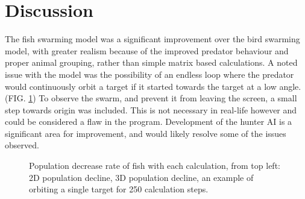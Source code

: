 \documentclass[
reprint,
showpacs,
preprintnumbers,
bibnotes,
amsmath,
amssymb,
aps,
pra,
floatfix,
]{revtex4-1}
\begin{document}
\section{\label{sec:discussion}Discussion}
The fish swarming model was a significant improvement over the bird swarming model, with greater realism because of the improved predator behaviour and proper animal grouping, rather than simple matrix based calculations.
A noted issue with the model was the possibility of an endless loop where the predator would continuously orbit a target if it started towards the target at a low angle. (FIG. \ref{fig:popdecline})
To observe the swarm, and prevent it from leaving the screen, a small step towards origin was included. This is not necessary in real-life however and could be considered a flaw in the program.
Development of the hunter AI is a significant area for improvement, and would likely resolve some of the issues observed.

\begin{figure}[!htp]
		\centering
		

	\caption{Population decrease rate of fish with each calculation, from top left: 2D population decline, 3D population decline, an example of orbiting a single target for 250 calculation steps.}
	\label{fig:popdecline}
\end{figure}
\end{document}
